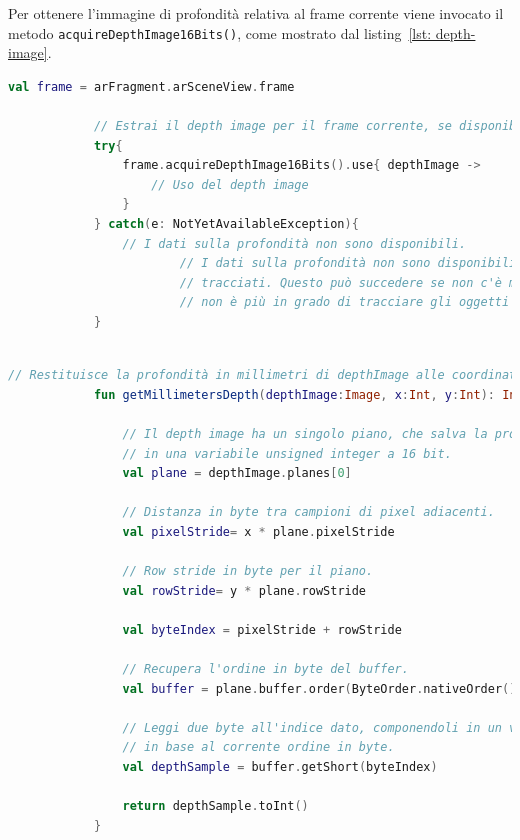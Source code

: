 \documentclass[crop=false, class=book]{standalone}
\begin{document}
		\noindent
		Per ottenere l'immagine di profondità relativa al frame corrente viene invocato il metodo \verb|acquireDepthImage16Bits()|, come mostrato dal listing~\vref{lst: depth-image}.\\
		
	\begin{center}
		\begin{minipage}{0.95\textwidth}
			\begin{lstlisting}[caption={ Estrazione di un'immagine profonda.}, label={lst: depth-image}, language=Kotlin]
			val frame = arFragment.arSceneView.frame

			// Estrai il depth image per il frame corrente, se disponibile.
			try{
				frame.acquireDepthImage16Bits().use{ depthImage ->
					// Uso del depth image
				}
			} catch(e: NotYetAvailableException){
				// I dati sulla profondità non sono disponibili.
						// I dati sulla profondità non sono disponibili se non ci sono feature point 
						// tracciati. Questo può succedere se non c'è movimento o quando la fotocamera 
						// non è più in grado di tracciare gli oggetti dell'ambiente circostante.
			}
			
			\end{lstlisting}
		\end{minipage}
	\end{center}
		\clearpage
	\begin{center}
		\begin{minipage}{0.95\textwidth}
			\begin{lstlisting}[caption={Estrazione di informazioni da un'immagine profonda.}, label={lst: inf-depth-img}, language=Kotlin]
			// Restituisce la profondità in millimetri di depthImage alle coordinate ([x], [y]).
			fun getMillimetersDepth(depthImage:Image, x:Int, y:Int): Int {
			
				// Il depth image ha un singolo piano, che salva la profondità per ogni pixel 
				// in una variabile unsigned integer a 16 bit.
				val plane = depthImage.planes[0]
				
				// Distanza in byte tra campioni di pixel adiacenti.
				val pixelStride= x * plane.pixelStride
				
				// Row stride in byte per il piano.
				val rowStride= y * plane.rowStride
				
				val byteIndex = pixelStride + rowStride 
				
				// Recupera l'ordine in byte del buffer. 
				val buffer = plane.buffer.order(ByteOrder.nativeOrder())
			
				// Leggi due byte all'indice dato, componendoli in un valore piccolo 
				// in base al corrente ordine in byte.
				val depthSample = buffer.getShort(byteIndex)
				
				return depthSample.toInt()
			}
			\end{lstlisting}
		\end{minipage}
	\end{center}
		
\end{document}
